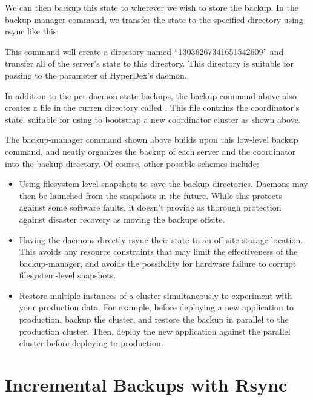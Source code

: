 We can then backup this state to wherever we wish to store the backup.  In the
backup-manager command, we transfer the state to the specified directory using
rsync like this:

\begin{consolecode}
\end{consolecode}

This command will create a directory named ``13036267341651542609'' and transfer
all of the server's state to this directory.  This directory is suitable for
passing to the  parameter of HyperDex's daemon.

In addition to the per-daemon state backups, the backup command above also
creates a file in the curren directory called .
This file contains the coordinator's state, suitable for using to bootstrap a
new coordinator cluster as shown above.

The backup-manager command shown above builds upon this low-level backup
command, and neatly organizes the backup of each server and the coordinator into
the backup directory.  Of course, other possible schemes include:

\begin{itemize}
\item Using filesystem-level snapshots to save the backup directories.  Daemons
may then be launched from the snapshots in the future.  While this protects
against some software faults, it doesn't provide as thorough protection against
disaster recovery as moving the backups offsite.

\item  Having the daemons directly rsync their state to an off-site storage
location.  This avoids any resource constraints that may limit the effectiveness
of the backup-manager, and avoids the possibility for hardware failure to
corrupt filesystem-level snapshots.

\item Restore multiple instances of a cluster simultaneously to experiment with
your production data.  For example, before deploying a new application to
production, backup the cluster, and restore the backup in parallel to the
production cluster.  Then, deploy the new application against the parallel
cluster before deploying to production.
\end{itemize}

\section{Incremental Backups with Rsync}

